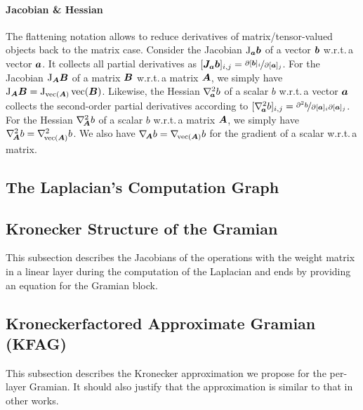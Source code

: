 \documentclass{article}
\begin{document}
\paragraph{Jacobian \& Hessian} The flattening notation allows to reduce derivatives of matrix/tensor-valued objects back to the matrix case.
Consider the Jacobian $\mathrm{J}_{{\bm{a}}}{\bm{b}}$ of a vector ${\bm{b}}$ w.r.t.\,a vector ${\bm{a}}$.
It collects all partial derivatives as $[{\bm{J}}_{{\bm{a}}}{\bm{b}}]_{i,j} = \nicefrac{\partial [{\bm{b}}]_i}{\partial [{\bm{a}}]_j}$.
For the Jacobian $\mathrm{J}_{{\bm{A}}}{\bm{B}}$ of a matrix ${\bm{B}}$ w.r.t.\,a matrix ${\bm{A}}$, we simply have $\mathrm{J}_{{\bm{A}}} {\bm{B}} = \mathrm{J}_{\operatorname{vec}( {\bm{A}} )}\operatorname{vec}({\bm{B}})$.
Likewise, the Hessian $\nabla_{\!{{\bm{a}}}}^{2}b$ of a scalar $b$ w.r.t.\,a vector ${\bm{a}}$ collects the second-order partial derivatives according to $[\nabla_{\!{{\bm{a}}}}^{2}b]_{i,j} = \nicefrac{\partial^2 b}{\partial [{\bm{a}}]_i \partial [{\bm{a}}]_j}$.
For the Hessian $\nabla_{\!{{\bm{A}}}}^{2} b$ of a scalar $b$ w.r.t.\,a matrix ${\bm{A}}$, we simply have $\nabla_{\!{{\bm{A}}}}^{2} b = \nabla_{\!{\operatorname{vec}({\bm{A}})}}^{2}b$.
We also have $\nabla_{\!{{\bm{A}}}} b = \nabla_{\!{\operatorname{vec}({\bm{A}})}} b$ for the gradient of a scalar w.r.t.\,a matrix.

\subsection{The Laplacian's Computation Graph}\label{sec:laplacian-computation-graph}


\subsection{Kronecker Structure of the Gramian}\label{sec:kronecker-structure-gramian}

This subsection describes the Jacobians of the operations with the weight matrix in
a linear layer during the computation of the Laplacian and ends by providing an
equation for the Gramian block.

\subsection{Kroneckerfactored Approximate Gramian (KFAG)}

This subsection describes the Kronecker approximation we propose for the per-layer Gramian.
It should also justify that the approximation is similar to that in other works.

\end{document}
